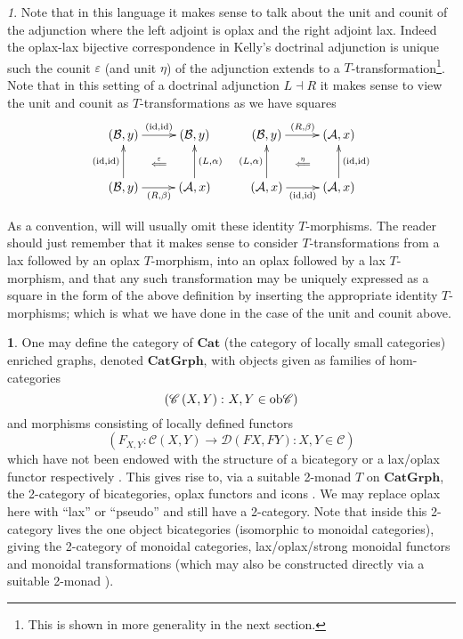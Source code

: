 \documentclass[a4paper,oneside,english]{amsart}
\numberwithin{equation}{section}
\numberwithin{figure}{section}
\theoremstyle{plain}
\theoremstyle{definition}
\theoremstyle{remark}
\newtheorem{rem}[thm]{\protect\remarkname}
\theoremstyle{definition}
\newtheorem{example}[thm]{\protect\examplename}
\theoremstyle{plain}
\theoremstyle{plain}
\theoremstyle{plain}
\providecommand{\examplename}{Example}
\providecommand{\remarkname}{Remark}
\begin{document}
\begin{rem}
\label{Ttransremark} Note that in this language it makes sense to
talk about the unit and counit of the adjunction where the left adjoint
is oplax and the right adjoint lax. Indeed the oplax-lax bijective
correspondence in Kelly's doctrinal adjunction \cite{doctrinal} is
unique such the counit ${\varepsilon}$ (and unit $\eta$) of the adjunction
extends to a $T$-transformation\footnote{This is shown in more generality in the next section.}.
Note that in this setting of a doctrinal adjunction $L\dashv R$ it
makes sense to view the unit and counit as $T$-transformations as
we have squares 
\[
\xymatrix@=1em{\left(\mathcal{B},y\right)\ar[rr]^{\left(\textnormal{id},\textnormal{id}\right)} &  & \left(\mathcal{B},y\right)\ar@{}[ldld]|-{\stackrel{\varepsilon}{\Longleftarrow}} &  & \left(\mathcal{B},y\right)\ar[rr]^{\left(R,\beta\right)} &  & \left(\mathcal{A},x\right)\ar@{}[ldld]|-{\stackrel{\eta}{\Longleftarrow}}\\
\\
\left(\mathcal{B},y\right)\ar[rr]_{\left(R,\beta\right)}\ar[uu]^{\left(\textnormal{id},\textnormal{id}\right)} &  & \left(\mathcal{A},x\right)\ar[uu]_{\left(L,\alpha\right)} &  & \left(\mathcal{A},x\right)\ar[rr]_{\left(\textnormal{id},\textnormal{id}\right)}\ar[uu]^{\left(L,\alpha\right)} &  & \left(\mathcal{A},x\right)\ar[uu]_{\left(\textnormal{id},\textnormal{id}\right)}
}
\]

As a convention, will will usually omit these identity $T$-morphisms.
The reader should just remember that it makes sense to consider $T$-transformations
from a lax followed by an oplax $T$-morphism, into an oplax followed
by a lax $T$-morphism, and that any such transformation may be uniquely
expressed as a square in the form of the above definition by inserting
the appropriate identity $T$-morphisms; which is what we have done
in the case of the unit and counit above.\end{rem}
\begin{example}
One may define the category of $\mathbf{Cat}$ (the category of locally
small categories) enriched graphs, denoted $\mathbf{CatGrph}$, with
objects given as families of hom-categories 
\[
\left(\mathscr{C}\left(X,Y\right)\colon X,Y\in\textnormal{ob}\mathscr{C}\right)
\]
 and morphisms consisting of locally defined functors 
\[
\left(F_{X,Y}:\mathscr{C}\left(X,Y\right)\to\mathscr{D}\left(FX,FY\right)\colon X,Y\in\mathscr{C}\right)
\]
which have not been endowed with the structure of a bicategory or
a lax/oplax functor respectively \cite{companion}. This gives rise
to, via a suitable 2-monad $T$ on $\mathbf{CatGrph}$, the 2-category
of bicategories, oplax functors and icons \cite{icons}. We may replace
oplax here with ``lax'' or ``pseudo'' and still have a 2-category.
Note that inside this 2-category lives the one object bicategories
(isomorphic to monoidal categories), giving the 2-category of monoidal
categories, lax/oplax/strong monoidal functors and monoidal transformations
(which may also be constructed directly via a suitable 2-monad \cite{icons}).
\end{example}
\end{document}

